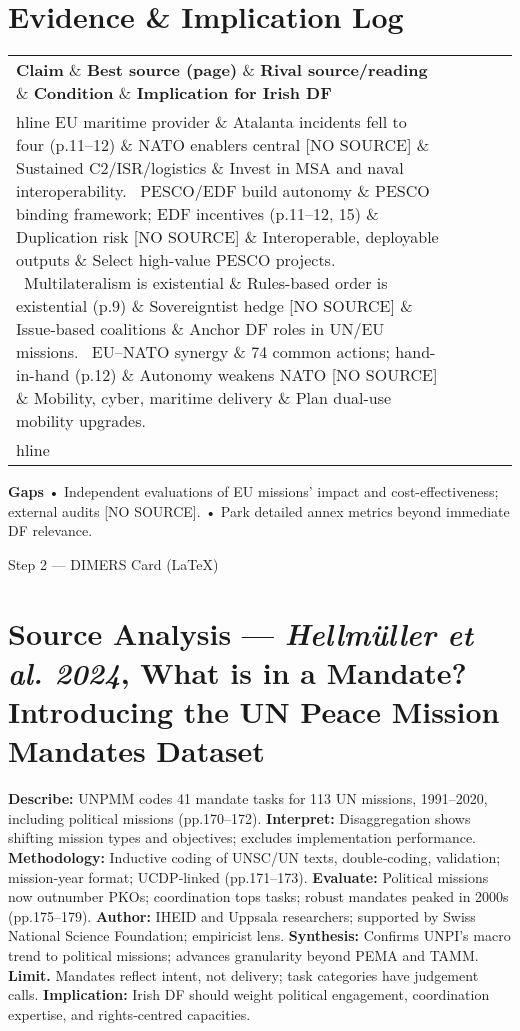 \section*{Evidence \& Implication Log}
\begin{tabular}{p{3.2cm}p{4.2cm}p{3.6cm}p{3.2cm}p{4.2cm}}
	\textbf{Claim} \& \textbf{Best source (page)} \& \textbf{Rival source/reading} \& \textbf{Condition} \& \textbf{Implication for Irish DF}\\hline
	EU maritime provider \& Atalanta incidents fell to four (p.11–12) \& NATO enablers central [NO SOURCE] \& Sustained C2/ISR/logistics \& Invest in MSA and naval interoperability. \
	PESCO/EDF build autonomy \& PESCO binding framework; EDF incentives (p.11–12, 15) \& Duplication risk [NO SOURCE] \& Interoperable, deployable outputs \& Select high-value PESCO projects. \
	Multilateralism is existential \& Rules-based order is existential (p.9) \& Sovereigntist hedge [NO SOURCE] \& Issue-based coalitions \& Anchor DF roles in UN/EU missions. \
	EU–NATO synergy \& 74 common actions; hand-in-hand (p.12) \& Autonomy weakens NATO [NO SOURCE] \& Mobility, cyber, maritime delivery \& Plan dual-use mobility upgrades. \\hline
\end{tabular}

\textbf{Gaps}
• Independent evaluations of EU missions’ impact and cost-effectiveness; external audits [NO SOURCE].
• Park detailed annex metrics beyond immediate DF relevance.


\parencite{HELLMUELLER_2014}

Step 2 — DIMERS Card (LaTeX)

\section*{Source Analysis — \textit{Hellmüller et al. 2024}, What is in a Mandate? Introducing the UN Peace Mission Mandates Dataset} \textbf{Describe:} UNPMM codes 41 mandate tasks for 113 UN missions, 1991–2020, including political missions (pp.170–172). \textbf{Interpret:} Disaggregation shows shifting mission types and objectives; excludes implementation performance. \textbf{Methodology:} Inductive coding of UNSC/UN texts, double‑coding, validation; mission‑year format; UCDP‑linked (pp.171–173). \textbf{Evaluate:} Political missions now outnumber PKOs; coordination tops tasks; robust mandates peaked in 2000s (pp.175–179). \textbf{Author:} IHEID and Uppsala researchers; supported by Swiss National Science Foundation; empiricist lens. \textbf{Synthesis:} Confirms UNPI’s macro trend to political missions; advances granularity beyond PEMA and TAMM. \textbf{Limit.} Mandates reflect intent, not delivery; task categories have judgement calls. \textbf{Implication:} Irish DF should weight political engagement, coordination expertise, and rights‑centred capacities.

